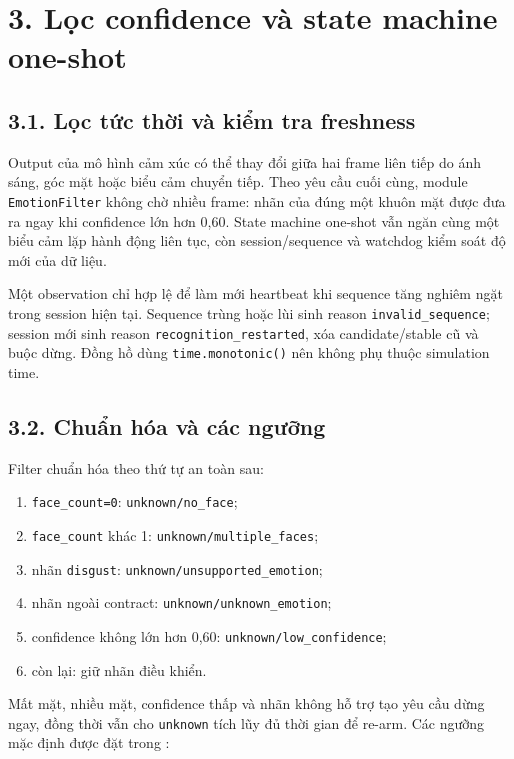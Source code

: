 \clearpage
\section*{3. Lọc confidence và state machine one-shot}

\subsection*{3.1. Lọc tức thời và kiểm tra freshness}

Output của mô hình cảm xúc có thể thay đổi giữa hai frame liên tiếp do ánh
sáng, góc mặt hoặc biểu cảm chuyển tiếp. Theo yêu cầu cuối cùng, module
\texttt{EmotionFilter} không chờ nhiều frame: nhãn của đúng một khuôn mặt được
đưa ra ngay khi confidence lớn hơn 0,60. State machine one-shot vẫn ngăn cùng
một biểu cảm lặp hành động liên tục, còn session/sequence và watchdog kiểm soát
độ mới của dữ liệu.

Một observation chỉ hợp lệ để làm mới heartbeat khi sequence tăng nghiêm ngặt
trong session hiện tại. Sequence trùng hoặc lùi sinh reason
\texttt{invalid\_sequence}; session mới sinh reason
\texttt{recognition\_restarted}, xóa candidate/stable cũ và buộc dừng. Đồng hồ
dùng \texttt{time.monotonic()} nên không phụ thuộc simulation time.

\subsection*{3.2. Chuẩn hóa và các ngưỡng}

Filter chuẩn hóa theo thứ tự an toàn sau:

\begin{enumerate}[leftmargin=1cm,itemsep=0.15em]
  \item \texttt{face\_count=0}: \texttt{unknown/no\_face};
  \item \texttt{face\_count} khác 1: \texttt{unknown/multiple\_faces};
  \item nhãn \texttt{disgust}: \texttt{unknown/unsupported\_emotion};
  \item nhãn ngoài contract: \texttt{unknown/unknown\_emotion};
  \item confidence không lớn hơn 0,60: \texttt{unknown/low\_confidence};
  \item còn lại: giữ nhãn điều khiển.
\end{enumerate}

Mất mặt, nhiều mặt, confidence thấp và nhãn không hỗ trợ tạo yêu cầu dừng ngay,
đồng thời vẫn cho \texttt{unknown} tích lũy đủ thời gian để re-arm. Các ngưỡng
mặc định được đặt trong :

